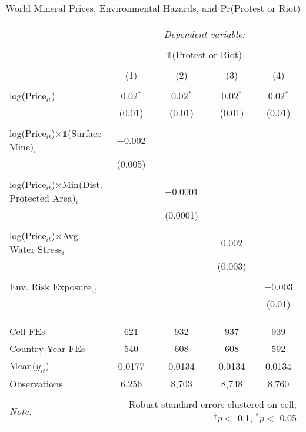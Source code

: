 \begin{table}[ht!] \centering
  \caption{World Mineral Prices, Environmental Hazards, and Pr(Protest or Riot)}
  \label{tab:did_acled_price_environment}
\footnotesize
\begin{tabular}{@{\extracolsep{0pt}}lcccc}
\\[-1.8ex]\hline
\hline \\[-1.8ex]
 & \multicolumn{4}{c}{\textit{Dependent variable:}} \\
\cline{2-5}
\\[-1.8ex] & \multicolumn{4}{c}{$\mathbb{1}$(Protest or Riot)} \\
\\[-1.8ex] & (1) & (2) & (3) & (4)\\
\hline \\[-1.8ex]
 log(Price$_{it}$) & 0.02$^{*}$ & 0.02$^{*}$ & 0.02$^{*}$ & 0.02$^{*}$ \\
  & (0.01) & (0.01) & (0.01) & (0.01) \\
  & & & & \\
 log(Price$_{it}$)$\times\mathbb{1}$(Surface Mine)$_i$ & $-$0.002 &  &  &  \\
  & (0.005) &  &  &  \\
  & & & & \\
 log(Price$_{it}$)$\times$Min(Dist. Protected Area)$_i$ &  & $-$0.0001 &  &  \\
  &  & (0.0001) &  &  \\
  & & & & \\
 log(Price$_{it}$)$\times$Avg. Water Stress$_i$ &  &  & 0.002 &  \\
  &  &  & (0.003) &  \\
  & & & & \\
 Env. Risk Exposure$_{ct}$ &  &  &  & $-$0.003 \\
  &  &  &  & (0.01) \\
  & & & & \\
\hline \\[-1.8ex]
\hline \\[-1.8ex] Cell FEs & 621 & 932 & 937 & 939 \\
Country-Year FEs & 540 & 608 & 608 & 592 \\
Mean($y_{it}$) & 0.0177 & 0.0134 & 0.0134 & 0.0134 \\
Observations & 6,256 & 8,703 & 8,748 & 8,760 \\
\hline
\hline \\[-1.8ex]
\textit{Note:}  & \multicolumn{4}{r}{Robust standard errors clustered on cell; $^{\dagger} p <$ 0.1, $^*p <$ 0.05} \\
\end{tabular}
\end{table}
